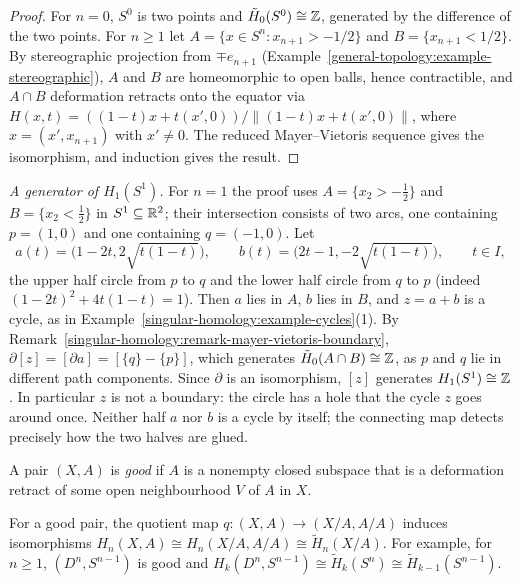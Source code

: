 \begin{proof}
For $n = 0$, $S^0$ is two points and $\tilde{H}_0(S^0) \cong \mathbb{Z}$, generated by the difference of the two points. For $n \geq 1$ let
$A = \{x \in S^n : x_{n+1} > -1/2\}$ and $B = \{x_{n+1} < 1/2\}$. By stereographic projection from $\mp e_{n+1}$ (Example~\ref{general-topology:example-stereographic}), $A$ and
$B$ are homeomorphic to open balls, hence contractible, and $A \cap B$ deformation retracts onto the equator via
$H(x, t) = ((1 - t)x + t(x', 0))/\|(1 - t)x + t(x', 0)\|$, where $x = (x', x_{n+1})$ with $x' \neq 0$. The reduced Mayer--Vietoris sequence gives the
isomorphism, and induction gives the result.
\end{proof}

\begin{example}\label{singular-homology:example-circle-generator}
\emph{A generator of $H_1(S^1)$.} For $n = 1$ the proof uses $A = \{x_2 > -\frac12\}$ and $B = \{x_2 < \frac12\}$ in $S^1 \subseteq \mathbb{R}^2$; their intersection consists of two
arcs, one containing $p = (1, 0)$ and one containing $q = (-1, 0)$. Let
\[
a(t) = \bigl(1 - 2t, 2\sqrt{t(1 - t)}\bigr), \qquad b(t) = \bigl(2t - 1, -2\sqrt{t(1 - t)}\bigr), \qquad t \in I,
\]
the upper half circle from $p$ to $q$ and the lower half circle from $q$ to $p$ (indeed $(1 - 2t)^2 + 4t(1 - t) = 1$). Then $a$ lies in $A$, $b$ lies in $B$, and $z = a + b$
is a cycle, as in Example~\ref{singular-homology:example-cycles}(1). By Remark~\ref{singular-homology:remark-mayer-vietoris-boundary}, $\partial[z] = [\partial a] = [\{q\} - \{p\}]$,
which generates $\tilde{H}_0(A \cap B) \cong \mathbb{Z}$, as $p$ and $q$ lie in different path components. Since $\partial$ is an isomorphism, $[z]$ generates $H_1(S^1) \cong \mathbb{Z}$. In
particular $z$ is not a boundary: the circle has a hole that the cycle $z$ goes around once. Neither half $a$ nor $b$ is a cycle by itself; the connecting map
detects precisely how the two halves are glued.
\end{example}

\begin{definition}\label{singular-homology:definition-good-pair}
A pair $(X, A)$ is \emph{good} if $A$ is a nonempty closed subspace that is a deformation retract of some open neighbourhood $V$ of $A$ in $X$.
\end{definition}

\begin{proposition}\label{singular-homology:proposition-good-pair}
For a good pair, the quotient map $q \colon (X, A) \to (X/A, A/A)$ induces isomorphisms $H_n(X, A) \cong H_n(X/A, A/A) \cong \tilde{H}_n(X/A)$. For example, for $n \geq 1$,
$(D^n, S^{n-1})$ is good and $H_k(D^n, S^{n-1}) \cong \tilde{H}_k(S^n) \cong \tilde{H}_{k-1}(S^{n-1})$.
\end{proposition}

